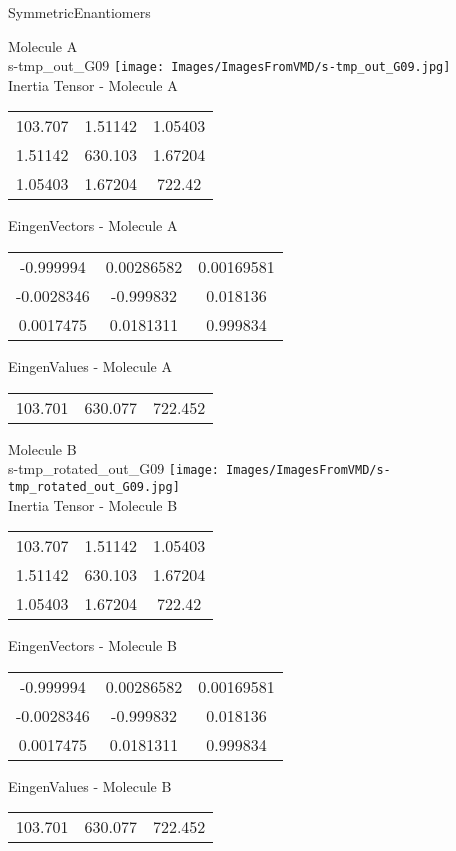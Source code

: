 \vtab[-2cm]
\begin{center}
{\large SymmetricEnantiomers}
\end{center}
\begin{multicols}{2}
\begin{center}
Molecule A \\ 
s-tmp\_out\_G09
\texttt{[image: Images/ImagesFromVMD/s-tmp\_out\_G09.jpg]}
\\
Inertia Tensor - Molecule A \\
\vtab
\begin{tabular}{|c c c|}
103.707	 & 	1.51142	 & 	1.05403	 \\
1.51142	 & 	630.103	 & 	1.67204	 \\
1.05403	 & 	1.67204	 & 	722.42
\end{tabular}

\vtab
 EingenVectors - Molecule A     \\
\vtab
\begin{tabular}{|c c c|}
-0.999994	 & 	0.00286582	 & 	0.00169581	 \\
-0.0028346	 & 	-0.999832	 & 	0.018136	 \\
0.0017475	 & 	0.0181311	 & 	0.999834
\end{tabular}

\vtab
 EingenValues - Molecule A     \\
\vtab
\begin{tabular}{|c c c|}
103.701	 & 	630.077	 & 	722.452
\end{tabular}
\columnbreak

Molecule B \\ 
s-tmp\_rotated\_out\_G09
\texttt{[image: Images/ImagesFromVMD/s-tmp\_rotated\_out\_G09.jpg]}
\\
Inertia Tensor - Molecule B \\
\vtab
\begin{tabular}{|c c c|}
103.707	 & 	1.51142	 & 	1.05403	 \\
1.51142	 & 	630.103	 & 	1.67204	 \\
1.05403	 & 	1.67204	 & 	722.42
\end{tabular}

\vtab
 EingenVectors - Molecule B     \\
\vtab
\begin{tabular}{|c c c|}
-0.999994	 & 	0.00286582	 & 	0.00169581	 \\
-0.0028346	 & 	-0.999832	 & 	0.018136	 \\
0.0017475	 & 	0.0181311	 & 	0.999834
\end{tabular}

\vtab
 EingenValues - Molecule B     \\
\vtab
\begin{tabular}{|c c c|}
103.701	 & 	630.077	 & 	722.452
\end{tabular}

\end{center}
\end{multicols}
